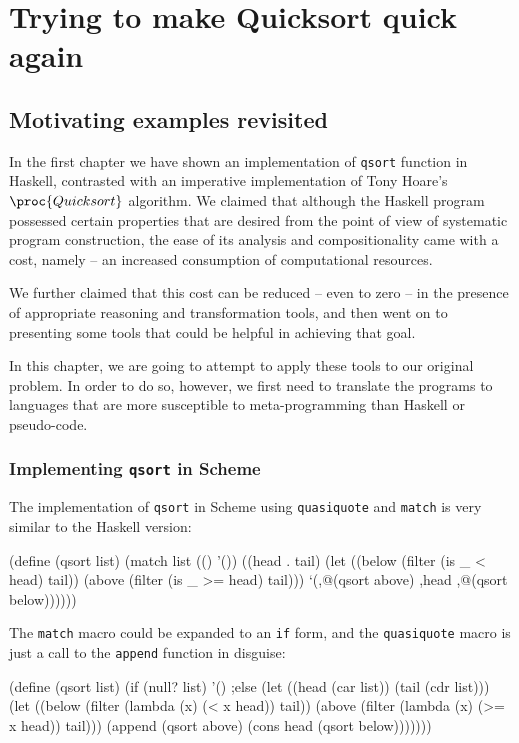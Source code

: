 \chapter{Trying to make Quicksort quick again}

\section{Motivating examples revisited}

In the first chapter we have shown an implementation
of \texttt{qsort} function in Haskell, contrasted with an imperative
implementation of Tony Hoare's $\proc{Quicksort}$ algorithm. We claimed
that although the Haskell program possessed certain properties that
are desired from the point of view of systematic program construction,
the ease of its analysis and compositionality came with a cost,
namely -- an increased consumption of computational resources.

We further claimed that this cost can be reduced -- even to zero
-- in the presence of appropriate reasoning and transformation tools,
and then went on to presenting some tools that could be helpful
in achieving that goal.

In this chapter, we are going to attempt to apply these tools
to our original problem. In order to do so, however, we first need to
translate the programs to languages that are more susceptible
to meta-programming than Haskell or pseudo-code.

\subsection{Implementing \texttt{qsort} in Scheme}

The implementation of \texttt{qsort} in Scheme using \texttt{quasiquote}
and \texttt{match} is very similar to the Haskell version:

\begin{Snippet}
  (define (qsort list)
    (match list
      (() '())
      ((head . tail)
       (let ((below (filter (is _ < head) tail))
             (above (filter (is _ >= head) tail)))
         `(,@(qsort above) ,head ,@(qsort below))))))
\end{Snippet}

The \texttt{match} macro could be expanded to an \texttt{if}
form, and the \texttt{quasiquote} macro is just a call to
the \texttt{append} function in disguise:

\begin{Snippet}
  (define (qsort list)
    (if (null? list)
      '()
    ;else
      (let ((head (car list))
            (tail (cdr list)))
        (let ((below (filter (lambda (x) (< x head)) tail))
              (above (filter (lambda (x) (>= x head)) tail)))
          (append (qsort above)
                  (cons head (qsort below)))))))
\end{Snippet}

